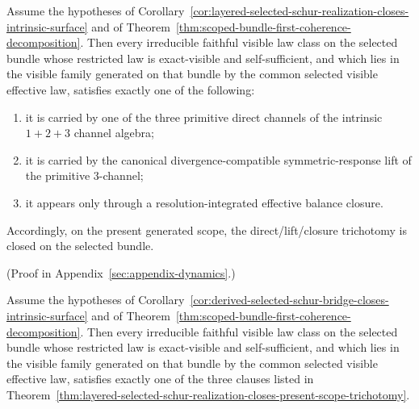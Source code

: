 \begin{theorem}
\label{thm:layered-selected-schur-realization-closes-present-scope-trichotomy}
Assume the hypotheses of
Corollary~\ref{cor:layered-selected-schur-realization-closes-intrinsic-surface}
and of
Theorem~\ref{thm:scoped-bundle-first-coherence-decomposition}. Then every
irreducible faithful visible law class on the selected bundle whose restricted
law is exact-visible and self-sufficient, and which lies in the visible family
generated on that bundle by the common selected visible effective law,
satisfies exactly one of the following:
\begin{enumerate}[label=(\alph*), leftmargin=2em, itemsep=0.2em]
\item it is carried by one of the three primitive direct channels of the
      intrinsic \(1+2+3\) channel algebra;
\item it is carried by the canonical divergence-compatible symmetric-response
      lift of the primitive \(3\)-channel;
\item it appears only through a resolution-integrated effective balance
      closure.
\end{enumerate}
Accordingly, on the present generated scope, the direct/lift/closure
trichotomy is closed on the selected bundle.
\end{theorem}

(Proof in Appendix~\ref{sec:appendix-dynamics}.)

\begin{corollary}
\label{cor:derived-selected-schur-bridge-closes-present-scope-trichotomy}
Assume the hypotheses of
Corollary~\ref{cor:derived-selected-schur-bridge-closes-intrinsic-surface}
and of
Theorem~\ref{thm:scoped-bundle-first-coherence-decomposition}. Then every
irreducible faithful visible law class on the selected bundle whose restricted
law is exact-visible and self-sufficient, and which lies in the visible family
generated on that bundle by the common selected visible effective law,
satisfies exactly one of the three clauses listed in
Theorem~\ref{thm:layered-selected-schur-realization-closes-present-scope-trichotomy}.
\end{corollary}


